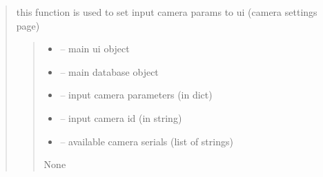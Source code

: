 \documentclass[letterpaper,10pt,english]{sphinxmanual}
\begin{document}
\begin{quote}

\begin{savenotes}\begin{fulllineitems}
\label{\detokenize{setting/backend/camera_funcs:oxin.backend.camera_funcs.set_camera_params_to_ui}}
\pysigstartsignatures
{}
\pysigstopsignatures
\sphinxAtStartPar
this function is used to set input camera params to ui (camera settings page)
\begin{quote}\begin{description}
\begin{itemize}
\item {} 
\sphinxAtStartPar
{} – main ui object

\item {} 
\sphinxAtStartPar
{} – main database object

\item {} 
\sphinxAtStartPar
{} – input camera parameters (in dict)

\item {} 
\sphinxAtStartPar
{} – input camera id (in string)

\item {} 
\sphinxAtStartPar
{} – available camera serials (list of strings)

\end{itemize}

\sphinxAtStartPar
None

\end{description}\end{quote}

\end{fulllineitems}\end{savenotes}



\end{quote}
\end{document}
